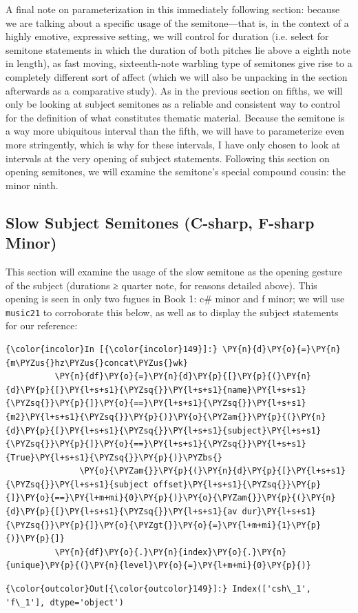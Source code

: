 A final note on parameterization in this immediately following section:
because we are talking about a specific usage of the semitone---that
is, in the context of a highly emotive, expressive setting, we will
control for duration (i.e. select for semitone statements in which the
duration of both pitches lie above a eighth note in length), as fast
moving, sixteenth-note warbling type of semitones give rise to a
completely different sort of affect (which we will also be unpacking in
the section afterwards as a comparative study). As in the previous
section on fifths, we will only be looking at subject semitones as a
reliable and consistent way to control for the definition of what
constitutes thematic material. Because the semitone is a way more
ubiquitous interval than the fifth, we will have to parameterize even
more stringently, which is why for these intervals, I have only chosen
to look at intervals at the very opening of subject statements.
Following this section on opening semitones, we will examine the
semitone's special compound cousin: the minor ninth.

    \subsection{Slow Subject Semitones (C-sharp, F-sharp
Minor)}\label{slow-subject-semitones-c-sharp-f-sharp-minor}

This section will examine the usage of the slow semitone as the opening
gesture of the subject (durations ≥ quarter note, for reasons detailed
above). This opening is seen in only two fugues in Book 1: c\# minor and
f minor; we will use \texttt{music21} to corroborate this below, as well
as to display the subject statements for our reference:

    \begin{Verbatim}[commandchars=\\\{\}]
{\color{incolor}In [{\color{incolor}149}]:} \PY{n}{d}\PY{o}{=}\PY{n}{m\PYZus{}hz\PYZus{}concat\PYZus{}wk}
          \PY{n}{df}\PY{o}{=}\PY{n}{d}\PY{p}{[}\PY{p}{(}\PY{n}{d}\PY{p}{[}\PY{l+s+s1}{\PYZsq{}}\PY{l+s+s1}{name}\PY{l+s+s1}{\PYZsq{}}\PY{p}{]}\PY{o}{==}\PY{l+s+s1}{\PYZsq{}}\PY{l+s+s1}{m2}\PY{l+s+s1}{\PYZsq{}}\PY{p}{)}\PY{o}{\PYZam{}}\PY{p}{(}\PY{n}{d}\PY{p}{[}\PY{l+s+s1}{\PYZsq{}}\PY{l+s+s1}{subject}\PY{l+s+s1}{\PYZsq{}}\PY{p}{]}\PY{o}{==}\PY{l+s+s1}{\PYZsq{}}\PY{l+s+s1}{True}\PY{l+s+s1}{\PYZsq{}}\PY{p}{)}\PYZbs{}
               \PY{o}{\PYZam{}}\PY{p}{(}\PY{n}{d}\PY{p}{[}\PY{l+s+s1}{\PYZsq{}}\PY{l+s+s1}{subject offset}\PY{l+s+s1}{\PYZsq{}}\PY{p}{]}\PY{o}{==}\PY{l+m+mi}{0}\PY{p}{)}\PY{o}{\PYZam{}}\PY{p}{(}\PY{n}{d}\PY{p}{[}\PY{l+s+s1}{\PYZsq{}}\PY{l+s+s1}{av dur}\PY{l+s+s1}{\PYZsq{}}\PY{p}{]}\PY{o}{\PYZgt{}}\PY{o}{=}\PY{l+m+mi}{1}\PY{p}{)}\PY{p}{]}
          \PY{n}{df}\PY{o}{.}\PY{n}{index}\PY{o}{.}\PY{n}{unique}\PY{p}{(}\PY{n}{level}\PY{o}{=}\PY{l+m+mi}{0}\PY{p}{)}
\end{Verbatim}
\begin{Verbatim}[commandchars=\\\{\}]
{\color{outcolor}Out[{\color{outcolor}149}]:} Index(['csh\_1', 'f\_1'], dtype='object')
\end{Verbatim}


